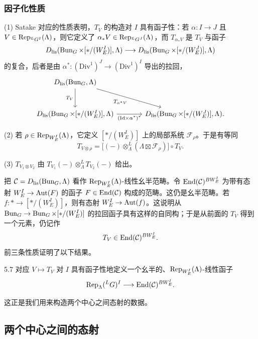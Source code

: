 \subsubsection{因子化性质}
(1) Satake 对应的性质表明，$T_{V}$ 的构造对 $I$ 具有函子性：若 $\alpha:I\to J$ 且 $V\in\operatorname{Rep}_{{}^{L}G^{I}}(\Lambda)$，则它定义了 $\alpha_{*}V\in\operatorname{Rep}_{{}^{L}G^{J}}(\Lambda)$，而 $T_{\alpha_{*}V}$ 是 $T_{V}$ 与函子
\[
D_{\mathrm{lis}}(\operatorname{Bun}_{G}\times[*/(W^{I}_{E})],\Lambda)\longrightarrow D_{\mathrm{lis}}(\operatorname{Bun}_{G}\times[*/(W^{J}_{E})],\Lambda)
\]
的复合，后者是由 $\alpha^{*}:(\mathrm{Div}^{1})^{J}\to(\mathrm{Div}^{1})^{I}$ 导出的拉回，
\[
\begin{tikzcd}[column sep=large,row sep=large]
D_{\mathrm{lis}}(\Bun_{G},\Lambda) \arrow[dr, "T_{\alpha^{*}V}"'] \arrow[d, "T_{V}"'] & \\
D_{\mathrm{lis}}(\Bun_{G}\times[*/(W^{I}_{E})],\Lambda) \arrow[r, "(\mathrm{Id}\times\alpha^{*})^{*}"'] & D_{\mathrm{lis}}(\Bun_{G}\times[*/(W^{J}_{E})],\Lambda).
\end{tikzcd}
\]

(2) 若 $\rho\in\operatorname{Rep}_{W^{I}_{E}}(\Lambda)$，它定义 $[*/(W^{I}_{E})]$ 上的局部系统 $\mathcal{F}_{\rho}$。于是有等同
\[
T_{V\otimes\rho}=\bigl[(-)\otimes^{L}_{\Lambda}(\Lambda\boxtimes\mathcal{F}_{\rho})\bigr]\circ T_{V}.
\]

(3) $T_{V_{1}\otimes V_{2}}$ 由 $T_{V_{1}}(-)\otimes^{L}_{\Lambda}T_{V_{2}}(-)$ 给出。

把 $\mathcal{C}=D_{\mathrm{lis}}(\operatorname{Bun}_{G},\Lambda)$ 看作 $\operatorname{Rep}_{W^{I}_{E}}(\Lambda)$-线性幺半范畴。令 $\operatorname{End}(\mathcal{C})^{BW^{I}_{E}}$ 为带有态射 $W^{I}_{E}\to\operatorname{Aut}(F)$ 的函子 $F\in\operatorname{End}(\mathcal{C})$ 构成的范畴。这仍是幺半范畴。若 $f:*\to[*/(W^{I}_{E})]$，则有态射 $W^{I}_{E}\to\operatorname{Aut}(f)$。这说明从 $\operatorname{Bun}_{G}\to\operatorname{Bun}_{G}\times[*/(W^{I}_{E})]$ 的拉回函子具有这样的自同构；于是从前面的 $T_{V}$ 得到一个元素，仍记作
\[
T_{V}\in\operatorname{End}(\mathcal{C})^{BW^{I}_{E}}.
\]
前三条性质证明了以下结果。

\begin{thm}{5.7}
对应 $V\mapsto T_{V}$ 对 $I$ 具有函子性地定义一个幺半的、$\operatorname{Rep}_{W^{I}_{E}}(\Lambda)$-线性函子
\[
\operatorname{Rep}_{\Lambda}({}^{L}G)^{I}\longrightarrow\operatorname{End}(\mathcal{C})^{BW^{I}_{E}}.
\]
\label{thm:a3-5-7}
\end{thm}

这正是我们用来构造两个中心之间态射的数据。

\subsection{两个中心之间的态射}
